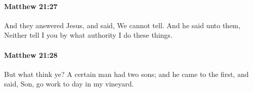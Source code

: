 		\paragraph{Matthew 21:27} %
			\label{MATTHEW-21-27}

			And they answered Jesus, and said, We cannot tell. And he said unto them, Neither tell I you by what authority I do these things.

			\begin{framed}
			\scriptsize
				\begin{compactdesc}
					\item[SBLG]  \hyperref[EXOUSIA]{} 
				\end{compactdesc}
			\end{framed}

		\paragraph{Matthew 21:28} %
			\label{MATTHEW-21-28}

			But what think ye? A certain man had two sons; and he came to the first, and said, Son, go work to day in my vineyard.

